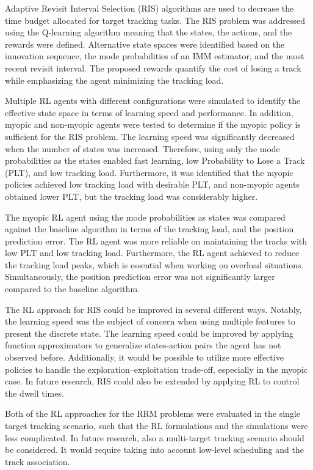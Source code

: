 \documentclass[english, 12pt, a4paper, elec, utf8, a-1b, online]{aaltothesis}
\numberwithin{equation}{section}
\begin{document}
Adaptive Revisit Interval Selection (RIS) algorithms are used to decrease the time budget allocated for target tracking tasks.
The RIS problem was addressed using the Q-learning algorithm meaning that the states, the actions, and the rewards were defined. 
Alternative state spaces were identified based on the innovation sequence, the mode probabilities of an IMM estimator, and the most recent revisit interval.
The proposed rewards quantify the cost of losing a track while emphasizing the agent minimizing the tracking load.

Multiple RL agents with different configurations were simulated to identify the effective state space in terms of learning speed and performance.
In addition, myopic and non-myopic agents were tested to determine if the myopic policy is sufficient for the RIS problem.
The learning speed was significantly decreased when the number of states was increased.
Therefore, using only the mode probabilities as the states enabled fast learning, low Probability to Lose a Track (PLT), and low tracking load.
Furthermore, it was identified that the myopic policies achieved low tracking load with desirable PLT, and non-myopic agents obtained lower PLT, but the tracking load was considerably higher.

The myopic RL agent using the mode probabilities as states was compared against the baseline algorithm in terms of the tracking load, and the position prediction error.
The RL agent was more reliable on maintaining the tracks with low PLT and low tracking load. 
Furthermore, the RL agent achieved to reduce the tracking load peaks, which is essential when working on overload situations.
Simultaneously, the position prediction error was not significantly larger compared to the baseline algorithm.

The RL approach for RIS could be improved in several different ways.
Notably, the learning speed was the subject of concern when using multiple features to present the discrete state.
The learning speed could be improved by applying function approximators \cite{Sutton2018} to generalize states-action pairs the agent has not observed before.
Additionally, it would be possible to utilize more effective policies to handle the exploration--exploitation trade-off, especially in the myopic case.
In future research, RIS could also be extended by applying RL to control the dwell times.

Both of the RL approaches for the RRM problems were evaluated in the single target tracking scenario, such that the RL formulations and the simulations were less complicated. 
In future research, also a multi-target tracking scenario should be considered. 
It would require taking into account low-level scheduling and the track association. 

\newpage
\thesisbibliography

\printbibliography
\end{document}
